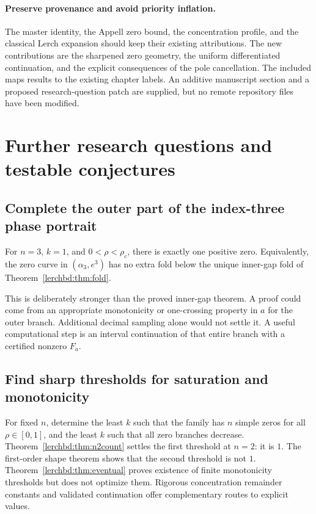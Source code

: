 \paragraph{Preserve provenance and avoid priority inflation.}
The master identity, the Appell zero bound, the concentration profile, and the classical Lerch expansion should keep their existing attributions. The new contributions are the sharpened zero geometry, the uniform differentiated continuation, and the explicit consequences of the pole cancellation. The included  maps results to the existing chapter labels. An additive manuscript section and a proposed research-question patch are supplied, but no remote repository files have been modified.

\section{Further research questions and testable conjectures}\label{lerchbd:sec:questions}
\subsection{Complete the outer part of the index-three phase portrait}
\begin{conjecture}\label{lerchbd:conj:outer}
For $n=3$, $k=1$, and $0<\rho<\rho_c$, there is exactly one positive zero. Equivalently, the zero curve in $(\alpha_3,e^3)$ has no extra fold below the unique inner-gap fold of Theorem~\ref{lerchbd:thm:fold}.
\end{conjecture}
This is deliberately stronger than the proved inner-gap theorem. A proof could come from an appropriate monotonicity or one-crossing property in $a$ for the outer branch. Additional decimal sampling alone would not settle it. A useful computational step is an interval continuation of that entire branch with a certified nonzero $F_a$.

\subsection{Find sharp thresholds for saturation and monotonicity}
For fixed $n$, determine the least $k$ such that the family has $n$ simple zeros for all $\rho\in[0,1]$, and the least $k$ such that all zero branches decrease. Theorem~\ref{lerchbd:thm:n2count} settles the first threshold at $n=2$: it is $1$. The first-order shape theorem shows that the second threshold is not $1$. Theorem~\ref{lerchbd:thm:eventual} proves existence of finite monotonicity thresholds but does not optimize them. Rigorous concentration remainder constants and validated continuation offer complementary routes to explicit values.

